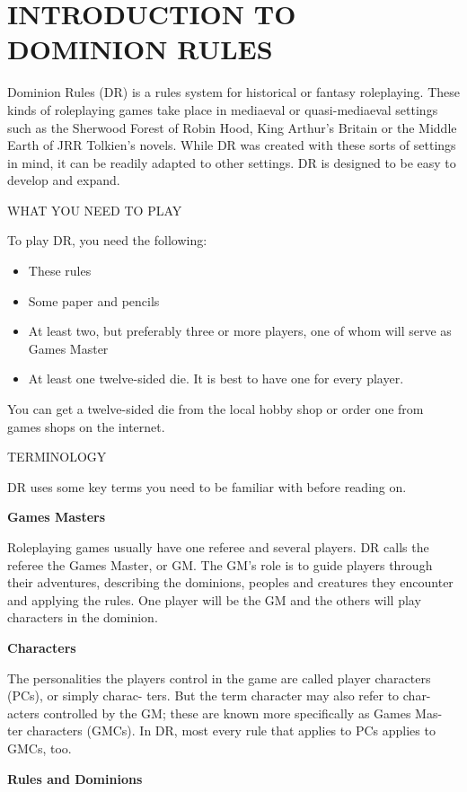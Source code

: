 \documentclass[11pt,twocolumn]{book}
\begin{document}
\pagestyle{headings}

\chapter{INTRODUCTION TO DOMINION RULES}

Dominion Rules (DR) is a rules system for historical or fantasy roleplaying. These kinds of roleplaying games take place in mediaeval or quasi-mediaeval settings such as the Sherwood Forest of Robin Hood, King Arthur’s Britain or the Middle Earth of JRR Tolkien’s novels. While DR was created with these sorts of settings in mind, it can be readily adapted to other settings. DR is designed to be easy to develop and expand.

WHAT YOU NEED TO PLAY

To play DR, you need the following:
\begin{itemize}
\item  These rules
\item  Some paper and pencils
\item  At least  two, but preferably three or more players, one of whom will serve as Games Master
\item  At  least one twelve-sided  die. It is  best  to have one for every player. 
\end{itemize}

You can get a twelve-sided die from the local hobby shop or order one from games shops on the internet.

TERMINOLOGY

DR uses some key terms you need to be familiar with before reading on.

\textbf{Games Masters}

Roleplaying games usually have one referee and several players. DR calls the referee the Games Master, or GM. The GM’s role is to guide players through their adventures, describing the dominions, peoples and creatures they encounter and applying the rules. One player will be the GM and the others will play characters in the dominion.

\textbf{Characters}

The personalities the players control in the game are called player characters (PCs), or simply charac- ters. But the term character may also refer to char- acters controlled by the GM; these are known more
specifically as Games Mas- ter characters (GMCs). In DR, most every rule that applies to PCs applies to GMCs, too.

\textbf{Rules and Dominions}
\end{document}

